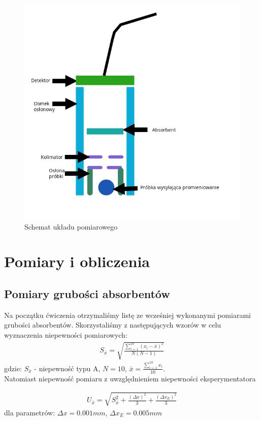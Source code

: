 \documentclass[a4paper]{article}
\newlength{\du}
\begin{document}
\begin{figure}[h!]
\centering
\includegraphics[scale=0.6]{schemat_ukladu}
\caption{Schemat układu pomiarowego}
\label{uklad}
\end{figure}


\section{Pomiary i obliczenia}
\subsection{Pomiary grubości absorbentów}
Na początku ćwiczenia otrzymaliśmy listę ze wcześniej wykonanymi pomiarami grubości absorbentów. Skorzystaliśmy z następujących wzorów w  celu wyznaczenia niepewności pomiarowych: 
\begin{align*}
S_{\bar{x}} = \sqrt{\frac{\sum_{i=1}^{10}(x_i-\bar{x})^2}{N(N-1)}}
\end{align*}
gdzie: $S_{\bar{x}}$ - niepewność typu A, $N = 10$, $\bar{x} = \frac{\sum_{i=1}^{10}x_i}{10}$. \\
Natomiast niepewność pomiaru z uwzględnieniem niepewności eksperymentatora

\begin{align*}
U_{\bar{x}} = \sqrt{S_{\bar{x}}^2 + \frac{(\Delta x)^2}{3} + \frac{(\Delta x_E)^2}{3}}
\end{align*}
dla parametrów: $\Delta x = 0.001 mm$, $\Delta x_E = 0.005 mm$
\end{document}

